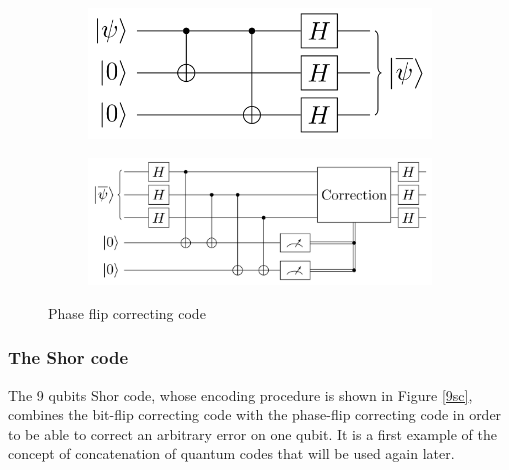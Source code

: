 \documentclass{article}
\begin{document}
\begin{figure}[H]
	\begin{subfigure}{0.5\textwidth}
		\includegraphics[scale = 0.20]{phase-flip-encode.png}
	\end{subfigure}
	\hspace{-50pt}
	\begin{subfigure}{0.5\textwidth}
		\includegraphics[scale = 0.18]{phase-flip-detect.png}
	\end{subfigure}
	\caption{Phase flip correcting code}\label{pfc}
\end{figure}


\subsubsection{The Shor code}
The 9 qubits Shor code, whose encoding procedure is shown in Figure \ref{9sc}, combines the bit-flip correcting code with the phase-flip
correcting code in order to be able to correct an arbitrary error on one qubit.
It is a first example of the concept of concatenation of quantum codes that will be
used again later.
\end{document}
